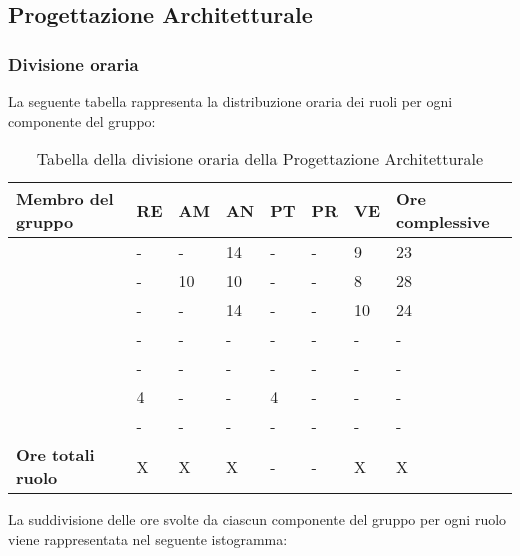 \subsection{Progettazione Architetturale}

\subsubsection{Divisione oraria}
La seguente tabella rappresenta la distribuzione oraria dei ruoli per ogni componente del gruppo:
\renewcommand{\arraystretch}{2}
\begin{longtable}[h!] { C{4cm} C{1cm} C{1cm} C{1cm} C{1cm} C{1cm} C{1cm} C{3cm}}
\caption{Tabella della divisione oraria della Progettazione Architetturale}\\
\rowcolor{\primaryColor}

\textcolor{\secondaryColor}{\textbf{Membro del gruppo}} & 
\textcolor{\secondaryColor}{\textbf{RE}} & 
\textcolor{\secondaryColor}{\textbf{AM}} & 
\textcolor{\secondaryColor}{\textbf{AN}} & 
\textcolor{\secondaryColor}{\textbf{PT}} & 
\textcolor{\secondaryColor}{\textbf{PR}} & 
\textcolor{\secondaryColor}{\textbf{VE}} & 
\textcolor{\secondaryColor}{\textbf{Ore complessive}}\\	
\endhead
        
\AW{}                     &  - &  - &  14 & - & - & 9 & 23 \\
\AT{}                     &  - &  10 & 10 & - & - & 8 & 28 \\
\AD{}                     &  - &  - &  14 & - & - & 10 & 24 \\
\EC{}                     &  - &  - &  - & - & - & - & - \\
\EM{}                     &  - &  - &  - & - & - & - & - \\
\FP{}                     &  4 &  - &  - & 4 & - & - & - \\
\GG{}                     &  - &  - &  - & - & - & - & - \\
\textbf{Ore totali ruolo} & X & X & X & - & - & X & X 

		
\end{longtable}
La suddivisione delle ore svolte da ciascun componente del gruppo per ogni ruolo viene rappresentata nel seguente istogramma:
